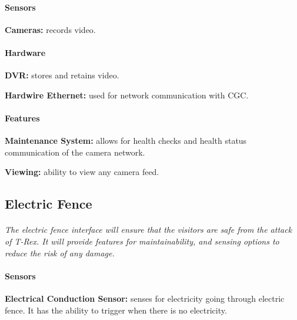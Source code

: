 \documentclass[12pt]{article}
\begin{document}
	\paragraph{Sensors}
	\begin{list}{}{}
		\item \textbf{Cameras: }records video. 
	\end{list}
		
	\paragraph{Hardware}
	\begin{list}{}{}
		\item \textbf{DVR: }stores and retains video.
		\item \textbf{Hardwire Ethernet: }used for network communication with CGC. 
	\end{list}
	
	\paragraph{Features}
	\begin{list}{}{}
		\item \textbf{Maintenance System: }allows for health checks and health status communication of the camera network.
        \item \textbf{Viewing: }ability to view any camera feed.
	\end{list}

	\subsection{Electric Fence}
	\paragraph{} \textit{The electric fence interface will ensure that the visitors are safe from the attack of T-Rex. It will provide features for maintainability, and sensing options to reduce the risk of any damage.}		
	
	\paragraph{Sensors}
	\begin{list}{}{}
		\item \textbf{Electrical Conduction Sensor: }senses for electricity going through electric fence. It has the ability to trigger when there is no electricity. 
	\end{list}
		
\end{document}
